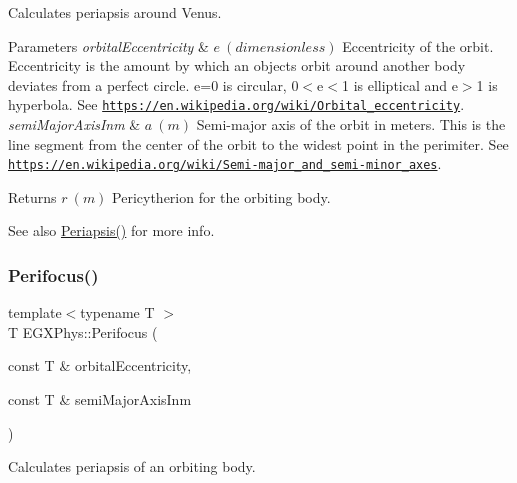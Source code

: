 Calculates periapsis around Venus. 


\begin{DoxyParams}{Parameters}
{\em orbital\+Eccentricity} & $ e\ (dimensionless)$ Eccentricity of the orbit. Eccentricity is the amount by which an objects orbit around another body deviates from a perfect circle. e=0 is circular, 0$<$e$<$1 is elliptical and e$>$1 is hyperbola. See \href{https://en.wikipedia.org/wiki/Orbital_eccentricity}{\tt https\+://en.\+wikipedia.\+org/wiki/\+Orbital\+\_\+eccentricity}. \\
\hline
{\em semi\+Major\+Axis\+Inm} & $ a\ (m)$ Semi-\/major axis of the orbit in meters. This is the line segment from the center of the orbit to the widest point in the perimiter. See \href{https://en.wikipedia.org/wiki/Semi-major_and_semi-minor_axes}{\tt https\+://en.\+wikipedia.\+org/wiki/\+Semi-\/major\+\_\+and\+\_\+semi-\/minor\+\_\+axes}. \\
\hline
\end{DoxyParams}
\begin{DoxyReturn}{Returns}
$ r\ (m)$ Pericytherion for the orbiting body. 
\end{DoxyReturn}
\begin{DoxySeeAlso}{See also}
\mbox{\hyperlink{group___e_g_x_phys-_periapsis_gad487212733711bc2ce73c8137c9309c3}{Periapsis()}} for more info. 
\end{DoxySeeAlso}
\mbox{\label{group___e_g_x_phys-_periapsis_ga569c67766dd7b590c630caa6582ad000}} 
\subsubsection{\texorpdfstring{Perifocus()}{Perifocus()}}
{\footnotesize\ttfamily template$<$typename T $>$ \\
T E\+G\+X\+Phys\+::\+Perifocus (\begin{DoxyParamCaption}\item[{const T \&}]{orbital\+Eccentricity,  }\item[{const T \&}]{semi\+Major\+Axis\+Inm }\end{DoxyParamCaption})}



Calculates periapsis of an orbiting body. 


